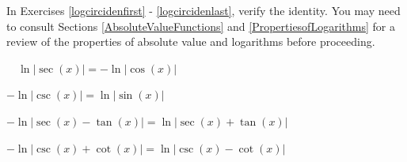 \documentclass{ximera}
\begin{document}
\begin{question}
In Exercises \ref{logcircidenfirst} - \ref{logcircidenlast}, verify the identity.  You may need to consult Sections \ref{AbsoluteValueFunctions} and \ref{PropertiesofLogarithms} for a review of the properties of absolute value and logarithms before proceeding.

\begin{problem}\label{logcircidenfirst}
    $\quad \ln|\sec(x)| = -\ln|\cos(x)|$ 
\end{problem}

\begin{problem}
     $-\ln|\csc(x)| = \ln|\sin(x)|$
\end{problem}

\begin{problem}
    $-\ln|\sec(x) - \tan(x)| = \ln|\sec(x)+\tan(x)|$
\end{problem}

\begin{problem} \label{logcircidenlast}
     $-\ln|\csc(x) + \cot(x)|= \ln|\csc(x) - \cot(x)|$
\end{problem}
\end{question}
\end{document}
